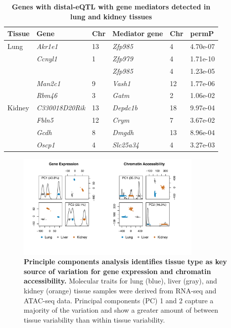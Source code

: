 \documentclass[9pt,twocolumn,twoside]{gsajnl}
\begin{document}
\begin{table}[h]
\renewcommand{\familydefault}{\sfdefault}\normalfont
\begin{tableminipage}{\textwidth}
\captionsetup{width=\textwidth}
\centering
\caption{\bf Genes with distal-eQTL with gene mediators detected in lung and kidney tissues
\label{tab:exmediation}}
\end{tableminipage}
\begin{tableminipage}{\textwidth}
\begin{tabularx}{\textwidth}{lll|XXX}
\hline 
Tissue & Gene & Chr & Mediator gene & Chr & permP \\
\hline
Lung & \textit{Akr1e1} & 13 & \textit{Zfp985} & 4 & 4.70e-07 \\
& \textit{Ccnyl1} & 1 & \textit{Zfp979} & 4 & 1.71e-10 \\
& & & \textit{Zfp985} & 4 & 1.23e-05 \\ 
& \textit{Man2c1} & 9 & \textit{Vash1} & 12 & 1.77e-06 \\
& \textit{Rbm46} & 3 & \textit{Gatm} & 2 & 1.06e-02 \\
\hline
Kidney & \textit{C330018D20Rik} & 13 & \textit{Depdc1b} & 18 & 9.97e-04 \\
& \textit{Fbln5} & 12 & \textit{Crym} & 7 & 3.67e-02 \\
& \textit{Gcdh} & 8 & \textit{Dmgdh} & 13 & 8.96e-04 \\
& \textit{Oscp1} & 4 & \textit{Slc25a34} & 4 & 3.27e-03 \\
\hline
\end{tabularx}
\end{tableminipage}
\end{table}

\clearpage

\begin{figure}[hp]
\renewcommand{\familydefault}{\sfdefault}\normalfont
\centering
\includegraphics[width=0.8\textwidth, trim={0.25in 0.5in 0.5in 0in}, clip]{figs/pca_plot.pdf}
\caption{\textbf{Principle components analysis identifies tissue type as key source of variation for gene expression and chromatin accessibility.} Molecular traits for lung (blue), liver (gray), and kidney (orange) tissue samples were derived from RNA-seq and ATAC-seq data. Principal components (PC) 1 and 2 capture a majority of the variation and show a greater amount of between tissue variability than within tissue variability. \label{fig:pca_plots}}
\end{figure}
\end{document}
